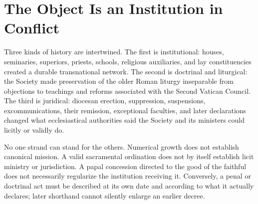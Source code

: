 \section{The Object Is an Institution in Conflict}


Three kinds of history are intertwined. The first is institutional: houses, seminaries, superiors, priests, schools, religious auxiliaries, and lay constituencies created a durable transnational network. The second is doctrinal and liturgical: the Society made preservation of the older Roman liturgy inseparable from objections to teachings and reforms associated with the Second Vatican Council. The third is juridical: diocesan erection, suppression, suspensions, excommunications, their remission, exceptional faculties, and later declarations changed what ecclesiastical authorities said the Society and its ministers could licitly or validly do.

No one strand can stand for the others. Numerical growth does not establish canonical mission. A valid sacramental ordination does not by itself establish licit ministry or jurisdiction. A papal concession directed to the good of the faithful does not necessarily regularize the institution receiving it. Conversely, a penal or doctrinal act must be described at its own date and according to what it actually declares; later shorthand cannot silently enlarge an earlier decree.
